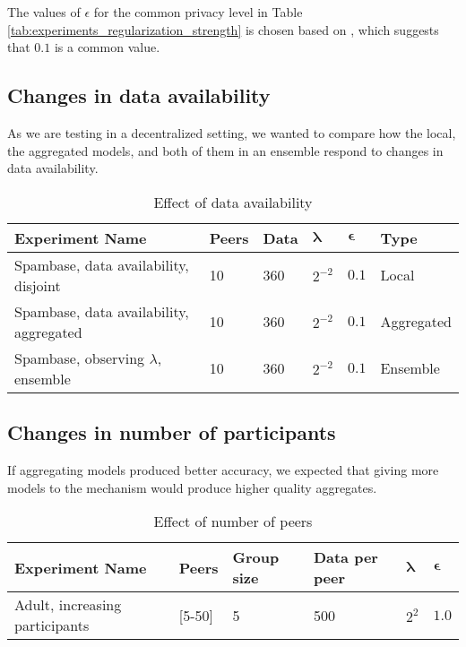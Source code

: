 The values of $\epsilon$ for the  common privacy level in Table \ref{tab:experiments_regularization_strength} is chosen based on \cite{dwork2008differential}, which suggests that $0.1$ is a common value.

\subsection{Changes in data availability}

As we are testing in a decentralized setting, we wanted to compare how the local, the aggregated models, and both of them in an ensemble respond to changes in data availability.

\begin{table}[h]
	\centering
	\begin{tabular}{|l|l|l|l|l|l|}
		\textbf{Experiment Name}                                 & \textbf{Peers} & \textbf{Data} & $\boldsymbol{\lambda}$ & $\boldsymbol{\epsilon}$ & \textbf{Type}       \\
		\hline
		Spambase, data availability, disjoint         & 10    & 360  & $2^{-2}$  & $0.1$      & Local      \\
		Spambase, data availability, aggregated    & 10    & 360  & $2^{-2}$  & $0.1$      & Aggregated \\
		Spambase, observing $\lambda$, ensemble & 10    & 360  & $2^{-2}$  & $0.1$  & Ensemble  
	\end{tabular}
	\caption{Effect of data availability}
	\label{tab:experiments_data_availability}
\end{table}

\subsection{Changes in number of participants}

If aggregating models produced better accuracy, we expected that giving more models to the mechanism would produce higher quality aggregates.

\begin{table}[h]
	\centering
	\begin{tabular}{|l|l|l|l|l|l|}
		\textbf{Experiment Name}                & \textbf{Peers}      & \textbf{Group size} & \textbf{Data per peer} & $\boldsymbol{\lambda}$ & $\boldsymbol{\epsilon}$ \\
		\hline
		Adult, increasing participants & {[}5-50{]} & 5          & 500  & $2^{2}$   & $1.0$     
	\end{tabular}
	\caption{Effect of number of peers}
	\label{tab:experiments_peer_numbers}
\end{table}

